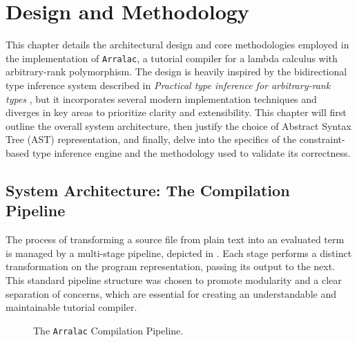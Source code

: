 \chapter{Design and Methodology}
\label{chap:DesignAndMethodology}

This chapter details the architectural design and core methodologies employed in the implementation of \texttt{Arralac}, a tutorial compiler for a lambda calculus with arbitrary-rank polymorphism. The design is heavily inspired by the bidirectional type inference system described in \textit{Practical type inference for arbitrary-rank types} \cite{jones-practical-2007}, but it incorporates several modern implementation techniques and diverges in key areas to prioritize clarity and extensibility. This chapter will first outline the overall system architecture, then justify the choice of Abstract Syntax Tree (AST) representation, and finally, delve into the specifics of the constraint-based type inference engine and the methodology used to validate its correctness.

\section{System Architecture: The Compilation Pipeline}
\label{sec:Design:Pipeline}

The process of transforming a source file from plain text into an evaluated term is managed by a multi-stage pipeline, depicted in . Each stage performs a distinct transformation on the program representation, passing its output to the next. This standard pipeline structure was chosen to promote modularity and a clear separation of concerns, which are essential for creating an understandable and maintainable tutorial compiler.

\begin{figure}[h!]
    \centering
    \caption{The \texttt{Arralac} Compilation Pipeline.}
    \label{fig:pipeline}
\end{figure}

